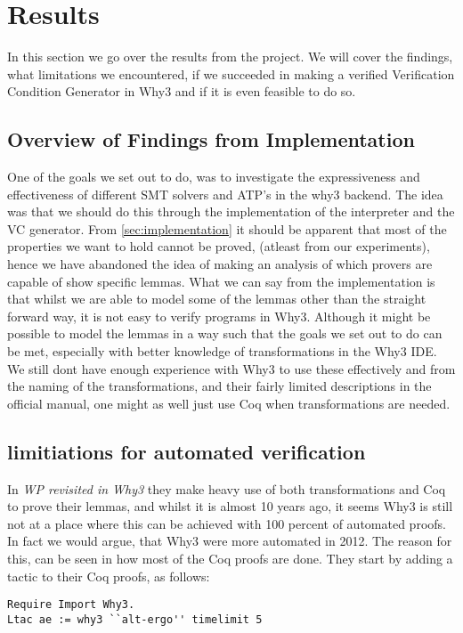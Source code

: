 \section{Results}
In this section we go over the results from the project.
We will cover the findings,
what limitations we encountered,
if we succeeded in making a verified Verification Condition Generator in Why3 and if it is even feasible to do so.

\subsection{Overview of Findings from Implementation}
One of the goals we set out to do, was to investigate the expressiveness and effectiveness of different SMT solvers and ATP's in the why3 backend.
The idea was that we should do this through the implementation of the interpreter and the VC generator.
From \ref{sec:implementation} it should be apparent that most of the properties we want to hold cannot be proved, (atleast from our experiments),
hence we have abandoned the idea of making an analysis of which provers are capable of show specific lemmas.
What we can say from the implementation is that whilst we are able to model some of the lemmas other than the straight forward way,
it is not easy to verify programs in Why3.
Although it might be possible to model the lemmas in a way such that the goals we set out to do can be met, especially with better knowledge of transformations in the Why3 IDE.
We still dont have enough experience with Why3 to use these effectively and from the naming of the transformations, and their fairly limited descriptions in the official manual, one might as well just use Coq when transformations are needed.

\subsection{limitiations for automated verification}
In \textit{WP revisited in Why3} they make heavy use of both transformations and Coq to prove their lemmas,
and whilst it is almost 10 years ago, it seems Why3 is still not at a place where this can be achieved with 100 percent of automated proofs. In fact we would argue, that Why3 were more automated in 2012. The reason for this, can be seen in how most of the Coq proofs are done.
They start by adding a tactic to their Coq proofs, as follows:

\begin{lstlisting}
Require Import Why3.
Ltac ae := why3 ``alt-ergo'' timelimit 5
\end{lstlisting}

